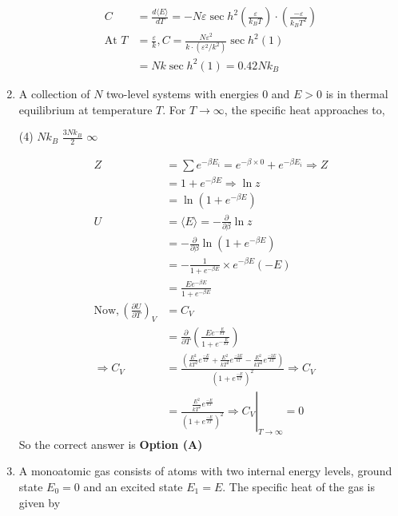 \begin{enumerate}
\begin{answer}
\begin{align*}
		C&=\frac{d\langle E\rangle}{d T}=-N \varepsilon \sec h^{2}\left(\frac{\varepsilon}{k_{B} T}\right) \cdot\left(\frac{-\varepsilon}{k_{B} T^{2}}\right)\\
		\text{At }T&=\frac{\varepsilon}{k}, C=\frac{N \varepsilon^{2}}{k \cdot\left(\varepsilon^{2} / k^{2}\right)} \sec h^{2}(1)\\&=N k \sec h^{2}(1)=0.42 N k_{B}
		\end{align*}
	\end{answer}	
	\item A collection of $N$ two-level systems with energies 0 and $E>0$ is in thermal
	equilibrium at temperature $T$. For $T \rightarrow \infty$, the specific heat approaches to,
	{}
	\begin{tasks}(4)
		\task[\textbf{B.}] $N k_{B}$
		\task[\textbf{C.}] $\frac{3 N k_{B}}{2}$
		\task[\textbf{D.}] $\infty$
	\end{tasks}
	\begin{answer}
		\begin{align*}
		Z&=\sum e^{-\beta E_{i}}=e^{-\beta \times 0}+e^{-\beta E_{i}} \Rightarrow Z\\&=1+e^{-\beta E} \Rightarrow \ln z\\&=\ln \left(1+e^{-\beta E}\right)\\
		U&=\langle E\rangle=-\frac{\partial}{\partial \beta} \ln z\\&=-\frac{\partial}{\partial \beta} \ln \left(1+e^{-\beta E}\right)\\&=-\frac{1}{1+e^{-\beta E}} \times e^{-\beta E}(-E)\\&=\frac{E e^{-\beta E}}{1+e^{-\beta E}}\\
		\text{Now},\left(\frac{\partial U}{\partial T}\right)_{V}&=C_{V}\\
		&=\frac{\partial}{\partial T}\left(\frac{E e^{-\frac{E}{k T}}}{1+e^{-\frac{E}{k T}}}\right)\\
		\Rightarrow C_{V}&=\frac{\left(\frac{E^{2}}{k T^{2}} e^{\frac{-E}{k T}}+\frac{E^{2}}{k T^{2}} e^{\frac{-2 E}{k T}}-\frac{E^{2}}{k T^{2}} e^{\frac{-2 E}{k T}}\right)}{\left(1+e^{\frac{-E}{k T}}\right)^{2}} \Rightarrow C_{V}\\
		&=\left.\frac{\frac{E^{2}}{k T^{2}} e^{\frac{-E}{k T}}}{\left(1+e^{\frac{-E}{k T}}\right)^{2}} \Rightarrow C_{V}\right|_{T \rightarrow \infty}=0
		\end{align*}
		So the correct answer is \textbf{Option (A)}
	\end{answer}	
	\item  A monoatomic gas consists of atoms with two internal energy levels, ground state $E_{0}=0$ and an excited state $E_{1}=E$. The specific heat of the gas is given by

\end{enumerate}
